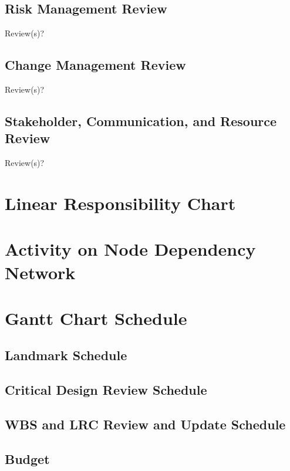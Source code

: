\subsection{Risk Management Review}
Review(s)?
\subsection{Change Management Review}
Review(s)?
\subsection{Stakeholder, Communication, and Resource Review}
Review(s)?
\section{Linear Responsibility Chart}
\section{Activity on Node Dependency Network}
\section{Gantt Chart Schedule}
\subsection{Landmark Schedule}
\subsection{Critical Design Review Schedule}
\subsection{WBS and LRC Review and Update Schedule}
\subsection{Budget}